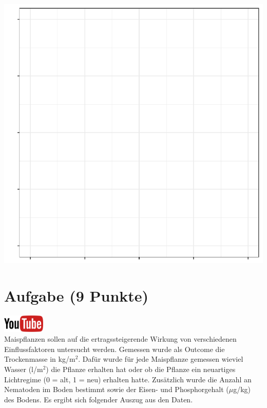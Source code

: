 \documentclass[a4paper, 10pt]{scrartcl}\usepackage[]{graphicx}\usepackage[]{xcolor}
\makeatletter
\def\maxwidth{ %
  \ifdim\Gin@nat@width>\linewidth
    \linewidth
  \else
    \Gin@nat@width
  \fi
}
\makeatother
\begin{document}
{\centering \includegraphics[width=\maxwidth]{img/modeling-R-01-1} 

}


 
\clearpage

\section{Aufgabe \hfill (9 Punkte)}

\hfill\href{https://youtu.be/NSMrpAYzOcs}{\includegraphics[width =
  2cm]{img/youtube}}\\[1Ex]



Maispflanzen sollen auf die ertragssteigerende Wirkung von verschiedenen
Einflussfaktoren untersucht werden. Gemessen wurde als Outcome die
Trockenmasse in kg/m$^2$. Daf{\"u}r wurde f{\"u}r jede Maispflanze gemessen wieviel
Wasser (l/m$^2$) die Pflanze erhalten hat oder ob die Pflanze ein
neuartiges Lichtregime (0 = alt, 1 = neu) erhalten hatte. Zus{\"a}tzlich wurde
die Anzahl an Nematoden im Boden bestimmt sowie der Eisen- und
Phosphorgehalt ($\mu$g/kg) des Bodens. Es ergibt sich folgender Auszug aus
den Daten.
\end{document}
